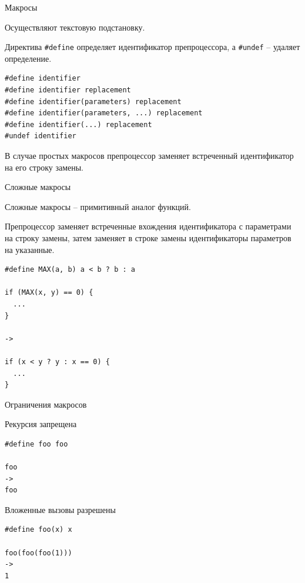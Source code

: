 \documentclass[unknownkeysallowed,xcolor=table]{beamer}
\begin{document}
\begin{frame}[fragile]{Макросы}

Осуществляют текстовую подстановку.

\vspace{1em}

Директива \lstinline{#define} определяет идентификатор препроцессора, а \lstinline{#undef} -- удаляет определение.

\vspace{0.5em}

\begin{lstlisting}
#define identifier
#define identifier replacement
#define identifier(parameters) replacement
#define identifier(parameters, ...) replacement
#define identifier(...) replacement
#undef identifier
\end{lstlisting}

\vspace{1em}

В случае простых макросов препроцессор заменяет встреченный идентификатор на его строку замены.

\end{frame}

\begin{frame}[fragile]{Сложные макросы}

Сложные макросы -- примитивный аналог функций.

Препроцессор заменяет встреченные вхождения идентификатора с параметрами на строку замены, затем заменяет в строке замены идентификаторы параметров на указанные.

\begin{lstlisting}
#define MAX(a, b) a < b ? b : a

if (MAX(x, y) == 0) {
  ...
}

->

if (x < y ? y : x == 0) {
  ...
}
\end{lstlisting}

\end{frame}

\begin{frame}[fragile]{Ограничения макросов}

Рекурсия запрещена

\begin{lstlisting}
#define foo foo

foo
->
foo
\end{lstlisting}

\vspace{2em}

Вложенные вызовы разрешены

\begin{lstlisting}
#define foo(x) x

foo(foo(foo(1)))
->
1
\end{lstlisting}

\end{frame}
\end{document}
